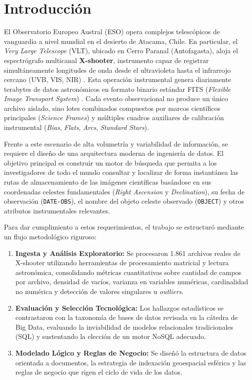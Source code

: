 \documentclass[10pt]{article}
\begin{document}
\section{Introducción}

El Observatorio Europeo Austral (ESO) opera complejos telescópicos de vanguardia a nivel mundial en el desierto de Atacama, Chile. En particular, el \textit{Very Large Telescope} (VLT), ubicado en Cerro Paranal (Antofagasta), aloja el espectrógrafo multicanal \textbf{X-shooter}, instrumento capaz de registrar simultáneamente longitudes de onda desde el ultravioleta hasta el infrarrojo cercano (UVB, VIS, NIR) \cite{vernet2011xshooter}. Esta operación instrumental genera diariamente terabytes de datos astronómicos en formato binario estándar FITS (\textit{Flexible Image Transport System}) \cite{pence2010fits}. Cada evento observacional no produce un único archivo aislado, sino lotes combinados compuestos por marcos científicos principales (\textit{Science Frames}) y múltiples cuadros auxiliares de calibración instrumental (\textit{Bias}, \textit{Flats}, \textit{Arcs}, \textit{Standard Stars}).

Frente a este escenario de alta volumetría y variabilidad de información, se requiere el diseño de una arquitectura moderna de ingeniería de datos. El objetivo principal es construir un motor de búsqueda que permita a los investigadores de todo el mundo consultar y localizar de forma instantánea las rutas de almacenamiento de las imágenes científicas basándose en sus coordenadas celestes fundamentales (\textit{Right Ascension} y \textit{Declination}), su fecha de observación (\texttt{DATE-OBS}), el nombre del objeto celeste observado (\texttt{OBJECT}) y otros atributos instrumentales relevantes.

Para dar cumplimiento a estos requerimientos, el trabajo se estructuró mediante un flujo metodológico riguroso:
\begin{enumerate}
    \item \textbf{Ingesta y Análisis Exploratorio:} Se procesaron 1.861 archivos reales de X-shooter utilizando herramientas de procesamiento matricial y lectura astronómica, consolidando métricas cuantitativas sobre cantidad de campos por archivo, densidad de vacíos, varianza en variables numéricas, cardinalidad no numérica y detección de valores singulares u \textit{outliers}.
    \item \textbf{Evaluación y Selección Tecnológica:} Los hallazgos estadísticos se contrastaron con la taxonomía de bases de datos revisada en la cátedra de Big Data, evaluando la inviabilidad de modelos relacionales tradicionales (SQL) y sustentando la elección de un motor NoSQL adecuado.
    \item \textbf{Modelado Lógico y Reglas de Negocio:} Se diseñó la estructura de datos orientada a documentos, la estrategia de indexación geoespacial esférica y las reglas de negocio que rigen el ciclo de vida de los datos.
\end{enumerate}
\end{document}

